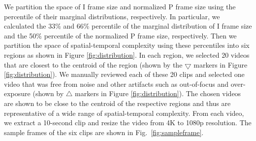 \documentclass{sig-alternate}
\begin{document}
We partition the space of I frame size and normalized P frame size using the percentile of their marginal distributions, respectively. In particular, we calculated the 33\% and 66\% percentile of the marginal distribution of I frame size and the 50\% percentile of the normalized P frame size, respectively. Then we partition the space of spatial-temporal complexity using these percentiles into six regions as shown in Figure \ref{fig:distribution}. In each region, we selected 20 videos that are closest to the centroid of the region (shown by the $\bigtriangledown$ markers in Figure \ref{fig:distribution}). We manually reviewed each of these 20 clips and selected one video that was free from noise and other artifacts such as out-of-focus and over-exposure (shown by $\triangle$ markers in Figure \ref{fig:distribution}). The chosen videos are shown to be close to the centroid of the respective regions and thus are representative of a wide range of spatial-temporal complexity. From each video, we extract a 10-second clip and resize the video from 4K to 1080p resolution. The sample frames of the six clips are shown in Fig.~\ref{fig:sampleframe}.
\end{document}
